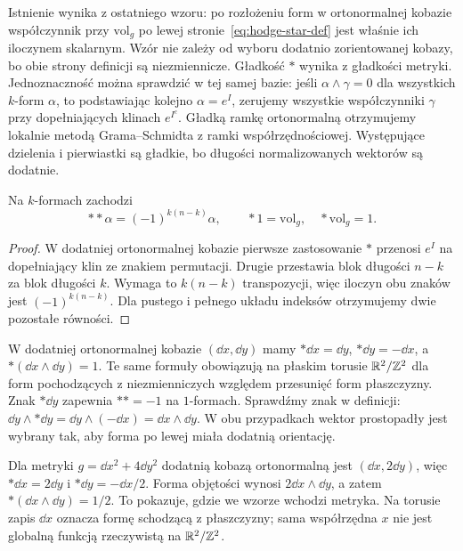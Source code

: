 Istnienie wynika z ostatniego wzoru: po rozłożeniu form w
ortonormalnej kobazie współczynnik przy $\mathrm{vol}_g$
po lewej stronie~\eqref{eq:hodge-star-def} jest właśnie
ich iloczynem skalarnym. Wzór nie zależy od wyboru
dodatnio zorientowanej kobazy, bo obie strony definicji
są niezmiennicze. Gładkość $*$ wynika z gładkości metryki.
Jednoznaczność można sprawdzić w tej samej bazie:
jeśli $\alpha\wedge\gamma=0$ dla wszystkich $k$-form $\alpha$,
to podstawiając kolejno $\alpha=e^I$, zerujemy wszystkie
współczynniki $\gamma$ przy dopełniających klinach $e^{I^c}$.
Gładką ramkę ortonormalną otrzymujemy lokalnie metodą
Grama--Schmidta z ramki współrzędnościowej.
Występujące dzielenia i pierwiastki są gładkie,
bo długości normalizowanych wektorów są dodatnie.

\begin{stwierdzenie}
\label{prop:hodge-star-square}
Na $k$-formach zachodzi
\begin{equation}\label{eq:hodge-star-square}
 **\alpha=(-1)^{k(n-k)}\alpha,
 \qquad *1=\mathrm{vol}_g,\quad *\mathrm{vol}_g=1.
\end{equation}
\end{stwierdzenie}
\begin{proof}
W dodatniej ortonormalnej kobazie pierwsze zastosowanie $*$
przenosi $e^I$ na dopełniający klin ze znakiem permutacji.
Drugie przestawia blok długości $n-k$ za blok długości $k$.
Wymaga to $k(n-k)$ transpozycji, więc iloczyn obu znaków
jest $(-1)^{k(n-k)}$. Dla pustego i pełnego układu indeksów
otrzymujemy dwie pozostałe równości.
\end{proof}

\begin{przyklad}
\label{prz:hodge-plaszczyzna-torus-18}
W dodatniej ortonormalnej kobazie $(\dd x,\dd y)$ mamy
$*\dd x=\dd y$, $*\dd y=-\dd x$, a
$*(\dd x\wedge\dd y)=1$. Te same formuły obowiązują na
płaskim torusie $\mathbb{R}^2/\mathbb{Z}^2$ dla form pochodzących z
niezmienniczych względem przesunięć form płaszczyzny.
Znak $*\dd y$ zapewnia $**=-1$ na $1$-formach.
Sprawdźmy znak w definicji:
$\dd y\wedge*\dd y=\dd y\wedge(-\dd x)=\dd x\wedge\dd y$.
W obu przypadkach wektor prostopadły jest wybrany tak,
aby forma po lewej miała dodatnią orientację.

Dla metryki $g=\dd x^2+4\dd y^2$ dodatnią kobazą
ortonormalną jest $(\dd x,2\dd y)$, więc
$*\dd x=2\dd y$ i $*\dd y=-\dd x/2$.
Forma objętości wynosi $2\dd x\wedge\dd y$,
a zatem $*(\dd x\wedge\dd y)=1/2$.
To pokazuje, gdzie we wzorze wchodzi metryka.
Na torusie zapis $\dd x$ oznacza formę schodzącą
z płaszczyzny; sama współrzędna $x$ nie jest globalną
funkcją rzeczywistą na $\mathbb{R}^2/\mathbb{Z}^2$.
\end{przyklad}

